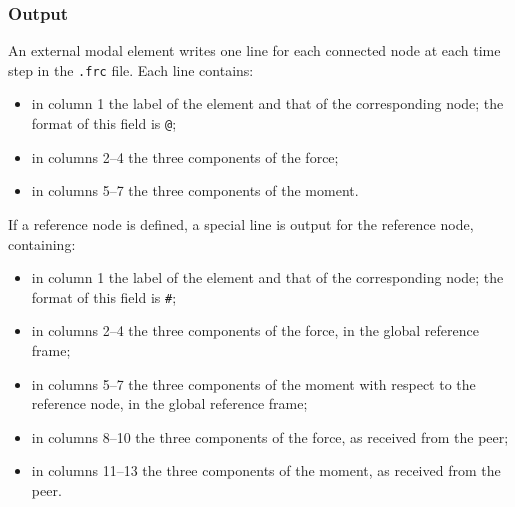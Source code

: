 \subsubsection{Output}
An external modal element writes one line for each connected node
at each time step in the \texttt{.frc} file.
Each line contains:
\begin{itemize}
\item in column 1 the label of the element and that of the corresponding node;
	the format of this field is \texttt{@};
\item in columns 2--4 the three components of the force;
\item in columns 5--7 the three components of the moment.
\end{itemize}
If a reference node is defined, a special line is output for the reference node,
containing:
\begin{itemize}
\item in column 1 the label of the element and that of the corresponding node;
	the format of this field is \texttt{\#};
\item in columns 2--4 the three components of the force,
	in the global reference frame;
\item in columns 5--7 the three components of the moment
	with respect to the reference node,
	in the global reference frame;
\item in columns 8--10 the three components of the force,
	as received from the peer;
\item in columns 11--13 the three components of the moment,
	as received from the peer.
\end{itemize}




